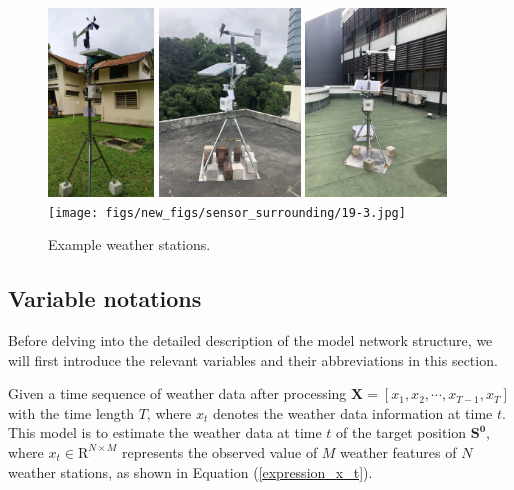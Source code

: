 \documentclass[a4paper,fleqn]{cas-sc}
\begin{document}
\begin{figure}[!h]
	\centering
 \includegraphics[height=5cm]{figs/new_figs/sensor_surrounding/12-3.jpg}
 \includegraphics[height=5cm]{figs/new_figs/sensor_surrounding/14-2.jpg}
 \includegraphics[height=5cm]{figs/new_figs/sensor_surrounding/15-2.jpg}
 \texttt{[image: figs/new\_figs/sensor\_surrounding/19-3.jpg]}
	\caption{Example weather stations.}
	\label{fig:sensor}
\end{figure}

\subsection{Variable notations
}\label{ModelSetup}
Before delving into the detailed description of the model network structure, we will first introduce the relevant variables and their abbreviations in this section.

Given a time sequence of weather data after processing $\mathbf{X} = [x_1,x_2,\cdots,x_{T-1},x_T]$ with the time length $T$, where $x_t$ denotes the weather data information at time $t$. This model is to estimate the weather data at time $t$ of the target position $\mathbf{S^0}$, where $x_t\in \mathrm{R}^{N\times M}$ represents the observed value of $M$ weather features of $N$ weather stations, as shown in Equation (\ref{expression_x_t}).
\end{document}
